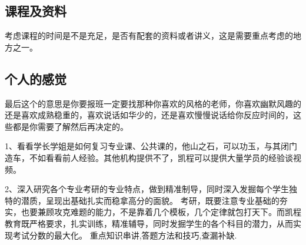 \documentclass[a4paper]{ctexart}
\begin{document}
\subsection{课程及资料}

考虑课程的时间是不是充足，是否有配套的资料或者讲义，这是需要重点考虑的地方之一。

\subsection{个人的感觉}

最后这个的意思是你要报班一定要找那种你喜欢的风格的老师，你喜欢幽默风趣的还是喜欢成熟稳重的，喜欢说话如华少的，还是喜欢慢慢说话给你反应时间的，这些都是你需要了解然后再决定的。

1、看看学长学姐是如何复习专业课、公共课的，他山之石，可以功玉，与其闭门造车，不如看看前人经验。其他机构提供不了，凯程可以提供大量学员的经验谈视频。

2、深入研究各个专业考研的专业特点，做到精准制导，同时深入发掘每个学生独特的潜质，呈现出基础扎实而稳拿高分的面貌。
考研，既要注意专业基础的夯实，也要兼顾攻克难题的能力，不是靠着几个模板，几个定律就包打天下。而凯程教育既严格要求，扎实训练，精准辅导，同时发掘学生的各个科目的潜力，从而实现考试分数的最大化。
重点知识串讲,答题方法和技巧,查漏补缺.
\end{document}
